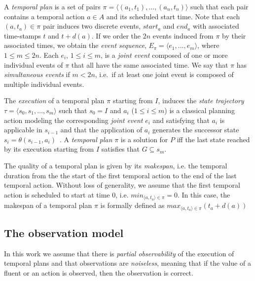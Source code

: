 \documentclass[letterpaper]{article} %
\newcommand{\tup}[1]{{\langle #1 \rangle}}
\begin{document}
A {\em temporal plan} is a set of pairs $\pi=\tup{(a_1,t_1), \ldots, (a_n,t_n)}$ such that each pair contains a temporal action $a\in A$ and its scheduled start time. Note that each $(a,t_a)\in \pi$ pair induces two discrete events, $start_a$ and $end_a$ with associated time-stamps $t$ and $t+d(a)$. If we order the $2n$ events induced from $\pi$ by their associated times, we obtain the {\em event sequence}, $E_{\pi}=\langle e_1,\ldots,e_m\rangle$, where {\small $1\leq m\leq 2n$}. Each $e_i$, {\small $1\leq i\leq m$}, is a {\em joint event} composed of one or more individual events of $\pi$ that all have the same associated time. We say that $\pi$ has {\em simultaneous events} if $m<2n$, i.e.~if at least one joint event is composed of multiple individual events. 

The {\em execution} of a temporal plan $\pi$ starting from $I$, induces the {\em state trajectory} $\tau=\tup{s_0, s_1, \ldots, s_m}$ such that $s_0=I$ and $a_i$ ({\small $1\leq i\leq m$}) is a classical planning action modeling the corresponding {\em joint event} $e_i$ and satisfying that $a_i$ is applicable in $s_{i-1}$ and that the application of $a_i$ generates the successor state $s_i=\theta(s_{i-1},a_i)$~\cite{jimenez2015temporal}. A {\em temporal plan} $\pi$ is a solution for $P$ iff the last state reached by its execution starting from $I$ satisfies that $G\subseteq s_m$.

The quality of a temporal plan is given by its {\em makespan}, i.e. the temporal duration from the the start of the first temporal action to the end of the last temporal action. Without loss of generality, we assume that the first temporal action is scheduled to start at time 0, i.e. $min_{\tup{a,t_a}\in\pi}= 0$. In this case, the makespan of a temporal plan $\pi$ is formally defined as $max_{\tup{a,t_a}\in\pi}(t_a+d(a))$


\subsection{The observation model}
In this work we assume that there is {\em partial observability} of the execution of temporal plans and that observations are {\em noiseless}, meaning that if the value of a fluent or an action is observed, then the observation is correct.
\end{document}
